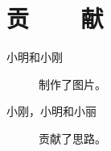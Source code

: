 ﻿\renewcommand{\baselinestretch}{1.5}
\fontsize{12pt}{13pt}\selectfont
{}
\chapter*{贡~~~~献}

\begin{description}
    \item[小明和小刚] 制作了图片。
    \item[小刚，小明和小丽] 贡献了思路。
\end{description}

\clearpage
\endinput
